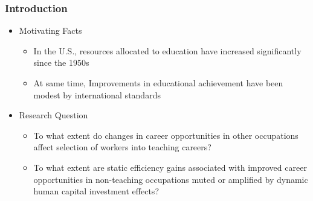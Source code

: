 \documentclass[11pt,hyperref={bookmarks=false},table,aspectratio=169]{beamer}
\begin{document}
	\begin{frame}
		\frametitle{Introduction}
		\begin{itemize}
\item Motivating Facts
	\begin{itemize}
		\item In the U.S., resources allocated to education have increased significantly since the 1950s
		\item At same time, Improvements in educational achievement have been modest by international standards
	\end{itemize}
\item Research Question
	\begin{itemize}
		\item To what extent do changes in career opportunities in other occupations affect selection of workers into teaching careers?
		\item To what extent are static efficiency gains associated with improved career opportunities in non-teaching occupations muted or amplified by dynamic human capital investment effects?
	\end{itemize}
\end{itemize}
	\end{frame}
	
\end{document}
